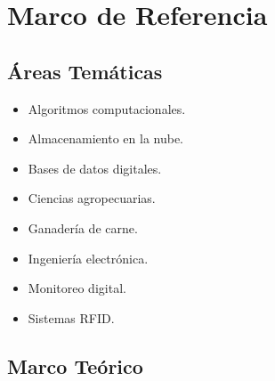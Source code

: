 
\section{Marco de Referencia}
\subsection{\'Areas Tem\'aticas}
\begin{itemize}
	\item Algoritmos computacionales.
	\item Almacenamiento en la nube.
	\item Bases de datos digitales.
	\item Ciencias agropecuarias. %
	\item Ganadería de carne.
	\item Ingeniería electrónica.
	\item Monitoreo digital.
	\item Sistemas RFID.
\end{itemize}

\subsection{Marco Te\'orico}


